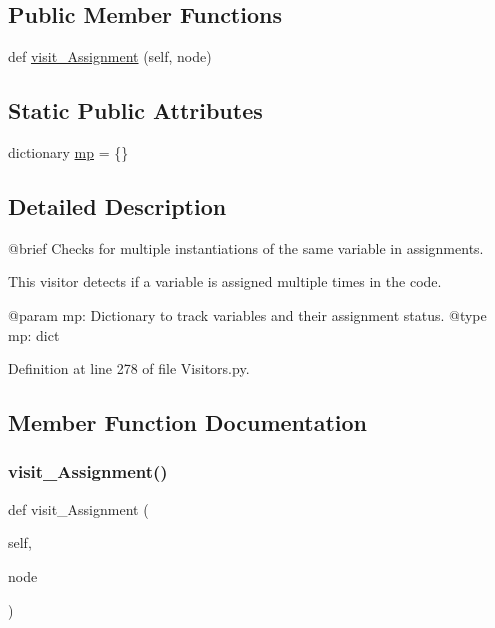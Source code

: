 \subsection*{Public Member Functions}
\begin{DoxyCompactItemize}
\item 
def \hyperlink{classVisitors_1_1AssignmentChecker_adae6ad6f5b94c4acd95924bb3df9ebc8}{visit\+\_\+\+Assignment} (self, node)
\end{DoxyCompactItemize}
\subsection*{Static Public Attributes}
\begin{DoxyCompactItemize}
\item 
dictionary \hyperlink{classVisitors_1_1AssignmentChecker_a7e7d1763667f44cb9cc57584f035aaf0}{mp} = \{\}
\end{DoxyCompactItemize}


\subsection{Detailed Description}
\begin{DoxyVerb}@brief Checks for multiple instantiations of the same variable in assignments.

This visitor detects if a variable is assigned multiple times in the code.

@param mp: Dictionary to track variables and their assignment status.
@type mp: dict
\end{DoxyVerb}
 

Definition at line 278 of file Visitors.\+py.



\subsection{Member Function Documentation}
\mbox{\label{classVisitors_1_1AssignmentChecker_adae6ad6f5b94c4acd95924bb3df9ebc8}} 
\subsubsection{\texorpdfstring{visit\+\_\+\+Assignment()}{visit\_Assignment()}}
{\footnotesize\ttfamily def visit\+\_\+\+Assignment (\begin{DoxyParamCaption}\item[{}]{self,  }\item[{}]{node }\end{DoxyParamCaption})}

